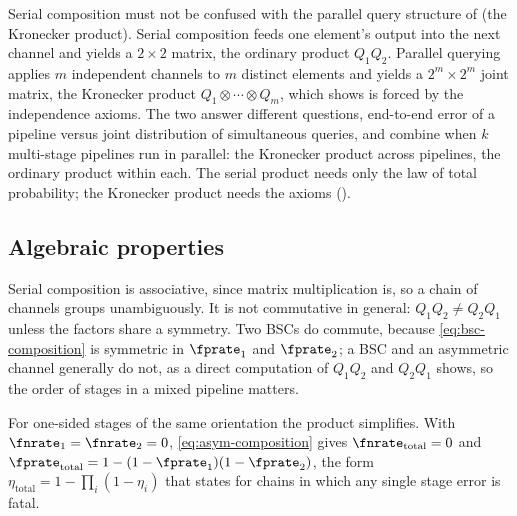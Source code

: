 Serial composition must not be confused with the parallel query structure of
 (the Kronecker product). Serial composition feeds one element's output into the
next channel and yields a $2 \times 2$ matrix, the ordinary product $Q_1 Q_2$.
Parallel querying applies $m$ independent channels to $m$ distinct elements and
yields a $2^m \times 2^m$ joint matrix, the Kronecker product $Q_1 \otimes
\cdots \otimes Q_m$, which  shows is forced by the
independence axioms. The two answer different questions, end-to-end error of a
pipeline versus joint distribution of simultaneous queries, and combine when
$k$ multi-stage pipelines run in parallel: the Kronecker product across
pipelines, the ordinary product within each. The serial product needs only the
law of total probability; the Kronecker product needs the axioms
().

\subsection*{Algebraic properties}

Serial composition is associative, since matrix multiplication is, so a chain of
channels groups unambiguously. It is not commutative in general: $Q_1 Q_2 \neq
Q_2 Q_1$ unless the factors share a symmetry. Two BSCs do commute, because
\eqref{eq:bsc-composition} is symmetric in $\fprate_1$ and $\fprate_2$; a BSC
and an asymmetric channel generally do not, as a direct computation of $Q_1 Q_2$
and $Q_2 Q_1$ shows, so the order of stages in a mixed pipeline matters.

For one-sided stages of the same orientation the product simplifies. With
$\fnrate_1 = \fnrate_2 = 0$, \eqref{eq:asym-composition} gives
$\fnrate_{\mathrm{total}} = 0$ and $\fprate_{\mathrm{total}} = 1 - (1 -
\fprate_1)(1 - \fprate_2)$, the form $\eta_{\mathrm{total}} = 1 -
\prod_{i}(1 - \eta_i)$ that  states for chains in
which any single stage error is fatal.
